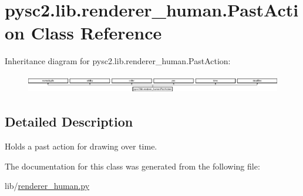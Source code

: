 \hypertarget{classpysc2_1_1lib_1_1renderer__human_1_1_past_action}{}\section{pysc2.\+lib.\+renderer\+\_\+human.\+Past\+Action Class Reference}
\label{classpysc2_1_1lib_1_1renderer__human_1_1_past_action}
Inheritance diagram for pysc2.\+lib.\+renderer\+\_\+human.\+Past\+Action\+:\begin{figure}[H]
\begin{center}
\leavevmode
\includegraphics[height=0.801144cm]{classpysc2_1_1lib_1_1renderer__human_1_1_past_action}
\end{center}
\end{figure}


\subsection{Detailed Description}
\begin{DoxyVerb}Holds a past action for drawing over time.\end{DoxyVerb}
 

The documentation for this class was generated from the following file\+:\begin{DoxyCompactItemize}
\item 
lib/\mbox{\hyperlink{renderer__human_8py}{renderer\+\_\+human.\+py}}\end{DoxyCompactItemize}
